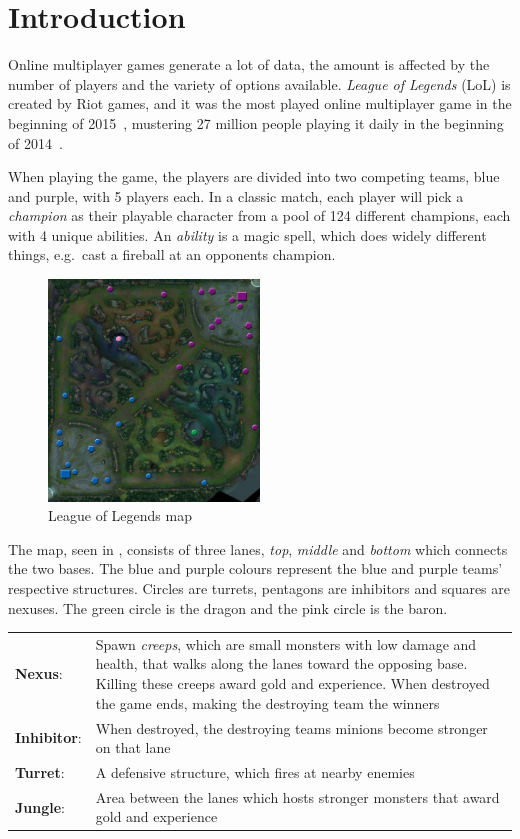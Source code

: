\section{Introduction}\label{sec:intro}
Online multiplayer games generate a lot of data, the amount is affected by the number of players and the variety of options available.
\emph{League of Legends} (LoL) is created by Riot games, and it was the most played online multiplayer game in the beginning of 2015~\cite{LoLmostplayed}, mustering 27 million people playing it daily in the beginning of 2014~\cite{LoL27mill}. 

When playing the game, the players are divided into two competing teams, blue and purple, with 5 players each. In a classic match, each player will pick a \emph{champion} as their playable character from a pool of 124 different champions, each with 4 unique abilities. An \emph{ability} is a magic spell, which does widely different things, e.g.\ cast a fireball at an opponents champion.

\begin{figure}[!htb]
  \centering
    \includegraphics[width=0.5\textwidth]{img/lolmap.jpg}
  \caption{League of Legends map}\label{fig:lolmap}
\end{figure}

The map, seen in , consists of three lanes, \emph{top}, \emph{middle} and \emph{bottom} which connects the two bases. The blue and purple colours represent the blue and purple teams' respective structures. Circles are turrets, pentagons are inhibitors and squares are nexuses. The green circle is the dragon and the pink circle is the baron.

\begin{table}[!h]
  \begin{tabular}{l p{13cm}}
    \textbf{Nexus}: & Spawn \emph{creeps}, which are small monsters with low damage and health, that walks along the lanes toward the opposing base. Killing these creeps award gold and experience. When destroyed the game ends, making the destroying team the winners\\
    \textbf{Inhibitor}: &  When destroyed, the destroying teams minions become stronger on that lane\\
    \textbf{Turret}: & A defensive structure, which fires at nearby enemies\\
    \textbf{Jungle}: & Area between the lanes which hosts stronger monsters that award gold and experience\\
  \end{tabular}
\end{table}

